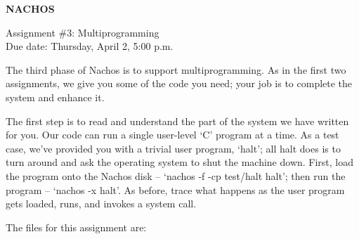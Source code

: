 


\begin{center}
{\large {\bf NACHOS}}



\vspace{.5in}
Assignment \#3: Multiprogramming\\
Due date: Thursday, April 2, 5:00 p.m.
\end{center}

\vspace{.2in}

The third phase of Nachos is to support multiprogramming.
As in the first two assignments, we give you some of the code
you need; your job is to complete the system and enhance it.

The first step is to read and understand the part of the system
we have written for you.  Our code can run a single user-level `C'
program at a time.  As a test case, we've provided you with 
a trivial user program, `halt'; all halt does is to turn around
and ask the operating system to shut the 
machine down.  First, load the program onto the Nachos disk -- 
`nachos -f -cp test/halt halt'; then run the program -- 
`nachos -x halt'.  As before, trace what happens as the user program
gets loaded, runs, and invokes a system call.

The files for this assignment are:

